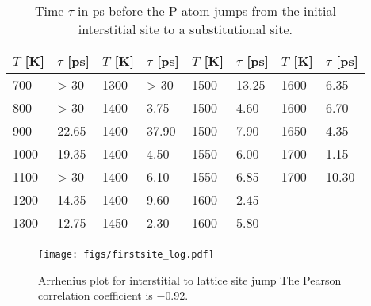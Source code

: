 \documentclass[11pt,bibliography=totoc,index=totoc]{scrbook}   %
\begin{document}
\begin{table}[htbp]
  \centering
  \begin{tabular}{llllllll}\toprule
      $T$ [K] & $\tau$ [ps] &
      $T$ [K] & $\tau$ [ps] &
      $T$ [K] & $\tau$ [ps] &
      $T$ [K] & $\tau$ [ps] \\\midrule
        700 & > 30 & 1300 & > 30 & 1500 & 13.25 & 1600 & 6.35\\
        800 & > 30 & 1400 & 3.75 & 1500 & 4.60 & 1600 & 6.70\\
        900 & 22.65 & 1400 & 37.90 & 1500 & 7.90 & 1650 & 4.35\\
        1000 & 19.35 & 1400 & 4.50 & 1550 & 6.00 & 1700 & 1.15\\
        1100 & > 30 & 1400 & 6.10 & 1550 & 6.85 & 1700 & 10.30\\
        1200 & 14.35 & 1400 & 9.60 & 1600 & 2.45 &  & \\
        1300 & 12.75 & 1450 & 2.30 & 1600 & 5.80 &  & \\
    \bottomrule
  \end{tabular}
  \caption{Time $\tau$ in ps before the P atom jumps from the initial interstitial site to a substitutional site.}
  \label{tab:interstitial-to-substitutional}
\end{table}


\begin{figure}[htbp]
  \centering
  \texttt{[image: figs/firstsite\_log.pdf]}
  \caption{Arrhenius plot for interstitial to lattice site jump
  The Pearson correlation coefficient is $-0.92$.}
  \label{fig:interstitial-to-substitutional}
\end{figure}





\end{document}
